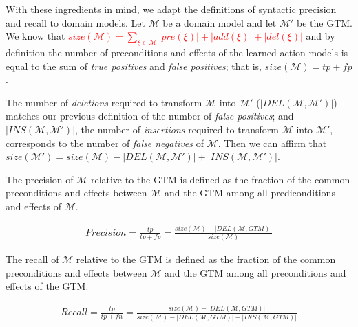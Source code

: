 With these ingredients in mind, we adapt the definitions of syntactic precision and recall to domain models. Let $\mathcal{M}$ be a domain model and let $\mathcal{M'}$ be the GTM. We know that \textcolor{red}{$size(\mathcal{M}) = \sum_{\xi \in \mathcal{M}}\left|pre(\xi)\right| + \left|add(\xi)\right| + \left|del(\xi)\right|$} and by definition the number of preconditions and effects of the learned action models is equal to the sum of {\em true positives} and {\em false positives}; that is, $size(\mathcal{M}) = tp + fp$.

The number of \emph{deletions} required to transform $\mathcal{M}$ into $\mathcal{M'}$ ($\left|DEL(\mathcal{M},\mathcal{M'})\right|$) matches our previous definition of the number of {\em false positives}; and $\left|INS(\mathcal{M},\mathcal{M'})\right|$, the number of \emph{insertions} required to transform $\mathcal{M}$ into $\mathcal{M'}$, corresponds to the number of {\em false negatives} of $\mathcal{M}$. Then we can affirm that $size(\mathcal{M'}) = size(\mathcal{M}) - \left|DEL(\mathcal{M},\mathcal{M'})\right| + \left|INS(\mathcal{M},\mathcal{M'})\right|$.

\begin{mydefinition} \label{syn-precision} The precision of $\mathcal{M}$ relative to the GTM is defined as the fraction of the common preconditions and effects between $\mathcal{M}$ and the GTM among all prediconditions and effects of $\mathcal{M}$.
	\begin{small}
		\begin{align*}
		Precision=\frac{tp}{tp+fp}=\frac{size(\mathcal{M})- \left|DEL(\mathcal{M},GTM)\right|}{size(\mathcal{M})}
		\end{align*}
	\end{small}
\end{mydefinition}



\begin{mydefinition} \label{syn-recall} The recall of $\mathcal{M}$ relative to the GTM is defined as the fraction of the common preconditions and effects between $\mathcal{M}$ and the GTM among all preconditions and effects of the GTM.
	
	\begin{small}
		\begin{align*}
		Recall= \frac{tp}{tp+fn}=
		\frac{size(\mathcal{M})- \left|DEL(\mathcal{M},GTM)\right|}{size(\mathcal{M}) - \left|DEL(\mathcal{M},GTM)\right| + \left|INS(\mathcal{M},GTM)\right|}
		\end{align*}
	\end{small}
\end{mydefinition}

